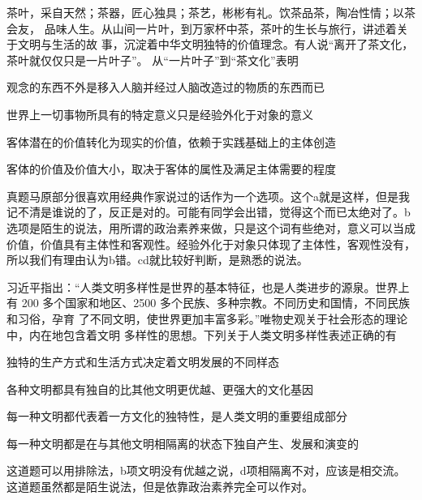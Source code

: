 \documentclass[lang=cn,blue,10pt,scheme=chinese,twocol]{zznote}
\begin{document}
\begin{exercise}茶叶，采自天然；茶器，匠心独具；茶艺，彬彬有礼。饮茶品茶，陶冶性情；以茶会友， 品味人生。从山间一片叶，到万家杯中茶，茶叶的生长与旅行，讲述着关于文明与生活的故 事，沉淀着中华文明独特的价值理念。有人说“离开了茶文化，茶叶就仅仅只是一片叶子”。 从“一片叶子”到“茶文化”表明
	\begin{choice}
		\item 观念的东西不外是移入人脑并经过人脑改造过的物质的东西而已
		\item 世界上一切事物所具有的特定意义只是经验外化于对象的意义
		\item 客体潜在的价值转化为现实的价值，依赖于实践基础上的主体创造
		\item 客体的价值及价值大小，取决于客体的属性及满足主体需要的程度
	\end{choice}
\end{exercise}
\begin{solution}
	真题马原部分很喜欢用经典作家说过的话作为一个选项。这个a就是这样，但是我记不清是谁说的了，反正是对的。可能有同学会出错，觉得这个而已太绝对了。b选项是陌生的说法，用所谓的政治素养来做，只是这个词有些绝对，意义可以当成价值，价值具有主体性和客观性。经验外化于对象只体现了主体性，客观性没有，所以我们有理由认为b错。cd就比较好判断，是熟悉的说法。
\end{solution}

\begin{exercise}习近平指出：“人类文明多样性是世界的基本特征，也是人类进步的源泉。世界上有 200 多个国家和地区、2500 多个民族、多种宗教。不同历史和国情，不同民族和习俗，孕育 了不同文明，使世界更加丰富多彩。”唯物史观关于社会形态的理论中，内在地包含着文明 多样性的思想。下列关于人类文明多样性表述正确的有
	\begin{choice}
		\item 独特的生产方式和生活方式决定着文明发展的不同样态
		\item 各种文明都具有独自的比其他文明更优越、更强大的文化基因
		\item 每一种文明都代表着一方文化的独特性，是人类文明的重要组成部分
		\item 每一种文明都是在与其他文明相隔离的状态下独自产生、发展和演变的
	\end{choice}
\end{exercise}
\begin{solution}
	这道题可以用排除法，b项文明没有优越之说，d项相隔离不对，应该是相交流。这道题虽然都是陌生说法，但是依靠政治素养完全可以作对。
\end{solution}
\end{document}
